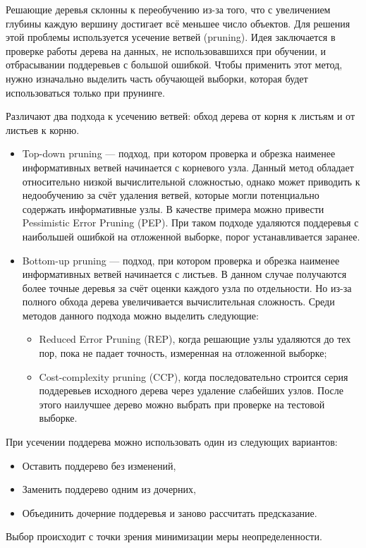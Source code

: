 Решающие деревья склонны к переобучению из-за того, что с увеличением глубины каждую вершину достигает всё меньшее число объектов. Для решения этой проблемы используется усечение ветвей (pruning). Идея заключается в проверке работы дерева на данных, не использовавшихся при обучении, и отбрасывании поддеревьев с большой ошибкой. Чтобы применить этот метод, нужно изначально выделить часть обучающей выборки, которая будет использоваться только при прунинге.

Различают два подхода к усечению ветвей: обход дерева от корня к листьям и от листьев к корню.     

\begin{itemize}
    \item Top-down pruning — подход, при котором проверка и обрезка наименее информативных ветвей начинается с корневого узла. Данный метод обладает относительно низкой вычислительной сложностью, однако может приводить к недообучению за счёт удаления ветвей, которые могли потенциально содержать информативные узлы. В качестве примера можно привести Pessimistic Error Pruning (PEP). При таком подходе удаляются поддеревья с наибольшей ошибкой на отложенной выборке, порог устанавливается заранее.
    
    \item Bottom-up pruning — подход, при котором проверка и обрезка наименее информативных ветвей начинается с листьев. В данном случае получаются более точные деревья за счёт оценки каждого узла по отдельности. Но из-за полного обхода дерева увеличивается вычислительная сложность. Среди методов данного подхода можно выделить следующие:
    \begin{itemize}
        \item Reduced Error Pruning (REP), когда решающие узлы удаляются до тех пор, пока не падает точность, измеренная на отложенной выборке;

        \item Cost-complexity pruning (CCP), когда последовательно строится серия поддеревьев исходного дерева через удаление слабейших узлов. После этого наилучшее дерево можно выбрать при проверке на тестовой выборке.
    \end{itemize}
\end{itemize}

При усечении поддерева можно использовать один из следующих вариантов:
\begin{itemize}
    \item Оставить поддерево без изменений,
    \item Заменить поддерево одним из дочерних,
    \item Объединить дочерние поддеревья и заново рассчитать предсказание.
\end{itemize}
Выбор происходит с точки зрения минимизации меры неопределенности.

